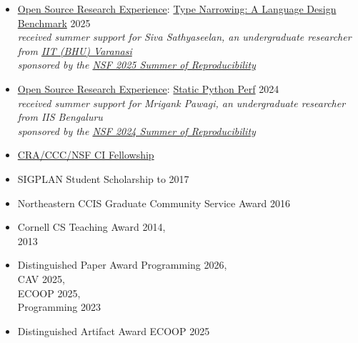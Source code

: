 \documentclass[11pt]{article}
\begin{document}

\begin{itemize}
  \item \href{https://ucsc-ospo.github.io/osre25/}{Open Source Research Experience}: \href{https://ucsc-ospo.github.io/project/osre25/uutah/type-narrowing/}{Type Narrowing: A Language Design Benchmark} \hfill 2025
    \\ \emph{received summer support for Siva Sathyaseelan, an undergraduate researcher from \href{https://www.iitbhu.ac.in/}{IIT (BHU) Varanasi}}
    \\ \emph{sponsored by the \href{https://www.nsf.gov/awardsearch/showAward?AWD_ID=2226407&HistoricalAwards=false}{NSF 2025 Summer of Reproducibility}}
  \item \href{https://ucsc-ospo.github.io/osre24/}{Open Source Research Experience}: \href{https://ucsc-ospo.github.io/project/osre24/uutah/static-python-perf/}{Static Python Perf} \hfill 2024
    \\ \emph{received summer support for Mrigank Pawagi, an undergraduate researcher from IIS Bengaluru}
    \\ \emph{sponsored by the \href{https://www.nsf.gov/awardsearch/showAward?AWD_ID=2226407&HistoricalAwards=false}{NSF 2024 Summer of Reproducibility}}
  \item \href{https://cifellows2020.org}{CRA/CCC/NSF CI Fellowship} \hfill {}
  \item {SIGPLAN Student Scholarship to \turing{}} \hfill 2017
  \item Northeastern CCIS Graduate Community Service Award \hfill 2016
  \item Cornell CS Teaching Award \hfill 2014, \\\hbox{}\hfill 2013
  \item Distinguished Paper Award \hfill Programming 2026, \\\hbox{}\hfill 
    CAV 2025, \\\hbox{}\hfill ECOOP 2025, \\\hbox{}\hfill Programming 2023
  \item Distinguished Artifact Award \hfill ECOOP 2025
\end{itemize}



\end{document}
